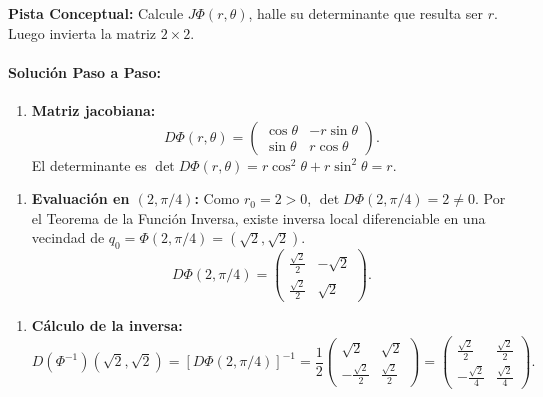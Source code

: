 \documentclass[11pt,a4paper]{article}
\begin{document}
\begin{tcolorbox}[colback=yellow!4,colframe=accentamber!70,arc=1mm,boxrule=0.5pt,left=3mm,right=3mm,top=1.5mm,bottom=1.5mm]
\textbf{Pista Conceptual:} Calcule $J\Phi(r,\theta)$, halle su determinante que resulta ser $r$. Luego invierta la matriz $2\times 2$.
\end{tcolorbox}

\paragraph{Solución Paso a Paso:}\par
\begin{enumerate}[label=\textbf{\arabic*.}]
\item \textbf{Matriz jacobiana:}
\begin{equation*}
D\Phi(r,\theta) = \begin{pmatrix} \cos\theta & -r\sin\theta \\ \sin\theta & r\cos\theta \end{pmatrix}.
\end{equation*}
El determinante es $\det D\Phi(r,\theta) = r\cos^2\theta + r\sin^2\theta = r$.
\end{enumerate}

\begin{enumerate}[label=\textbf{\arabic*.}]
\item \textbf{Evaluación en $(2, \pi/4)$:}
Como $r_0 = 2 > 0$, $\det D\Phi(2, \pi/4) = 2 \neq 0$.
Por el Teorema de la Función Inversa, existe inversa local diferenciable en una vecindad de $q_0 = \Phi(2, \pi/4) = (\sqrt{2}, \sqrt{2})$.
\begin{equation*}
D\Phi(2, \pi/4) = \begin{pmatrix} \frac{\sqrt{2}}{2} & -\sqrt{2} \\ \frac{\sqrt{2}}{2} & \sqrt{2} \end{pmatrix}.
\end{equation*}
\end{enumerate}

\begin{enumerate}[label=\textbf{\arabic*.}]
\item \textbf{Cálculo de la inversa:}
\begin{equation*}
D(\Phi^{-1})(\sqrt{2}, \sqrt{2}) = [D\Phi(2, \pi/4)]^{-1} = \frac{1}{2} \begin{pmatrix} \sqrt{2} & \sqrt{2} \\ -\frac{\sqrt{2}}{2} & \frac{\sqrt{2}}{2} \end{pmatrix} = \begin{pmatrix} \frac{\sqrt{2}}{2} & \frac{\sqrt{2}}{2} \\ -\frac{\sqrt{2}}{4} & \frac{\sqrt{2}}{4} \end{pmatrix}.
\end{equation*}
\end{enumerate}
\end{document}
